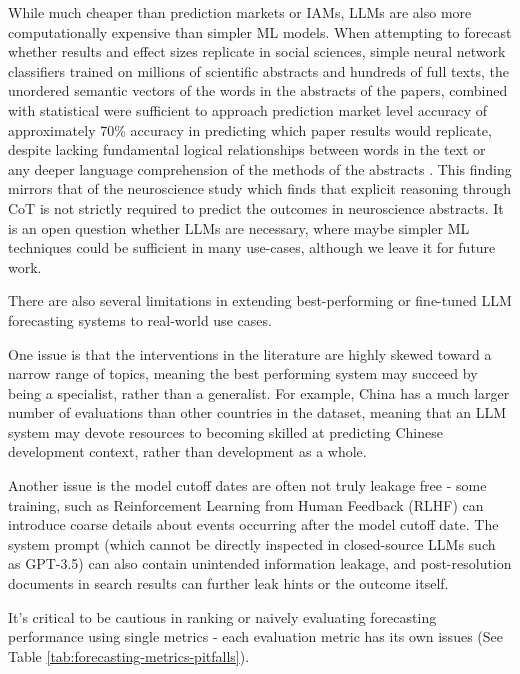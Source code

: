 \documentclass[12pt,a4paper]{article}
\begin{document}
While much cheaper than prediction markets or IAMs, LLMs are also more computationally expensive than simpler ML models. When attempting to forecast whether results and effect sizes replicate in social sciences, simple neural network classifiers trained on millions of scientific abstracts and hundreds of full texts, the unordered semantic vectors of the words in the abstracts of the papers, combined with statistical  were sufficient to approach prediction market level accuracy of approximately 70\% accuracy in predicting which paper results would replicate, despite lacking fundamental logical relationships between words in the text or any deeper language comprehension of the methods of the abstracts . This finding mirrors that of the neuroscience study  which finds that explicit reasoning through CoT is not strictly required to predict the outcomes in neuroscience abstracts. It is an open question \ABSTRACT whether LLMs are necessary, where maybe simpler ML techniques could be sufficient in many use-cases, although we leave it for future work.

There are also several limitations in extending best-performing or fine-tuned LLM forecasting systems to real-world use cases.

One issue is that the interventions in the literature are highly skewed toward a narrow range of topics, meaning the best performing system may succeed by being a specialist, rather than a generalist. For example, China has a much larger number of evaluations than other countries in the dataset, meaning that an LLM system may devote resources to becoming skilled at predicting Chinese development context, rather than development as a whole.

Another issue is the model cutoff dates are often not truly leakage free - some training, such as Reinforcement Learning from Human Feedback (RLHF) can introduce coarse details about events occurring after the model cutoff date. The system prompt (which cannot be directly inspected in closed-source LLMs such as GPT-3.5) can also contain unintended information leakage, and post-resolution documents in search results can further leak hints or the outcome itself. 

It's critical to be cautious in ranking or naively evaluating forecasting performance using single metrics - each evaluation metric has its own issues  (See Table \ref{tab:forecasting-metrics-pitfalls}).
\end{document}
